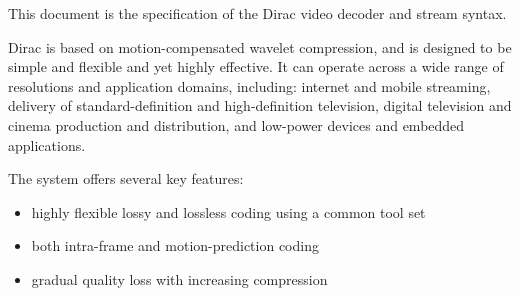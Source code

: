 
This document is the specification of the Dirac video decoder and stream syntax.

Dirac is based on motion-compensated wavelet compression, and is designed to be
simple and flexible and yet highly effective. It can operate across a wide range
 of resolutions and
application domains, including: internet and mobile streaming, delivery of 
standard-definition and high-definition
television, digital television and cinema production and distribution,
and low-power devices and embedded applications.

The system offers several key features:

\begin{itemize}
    \item highly flexible lossy and lossless coding using a common tool set
	\item both intra-frame and motion-prediction coding
	\item gradual quality loss with increasing compression 
\end{itemize}
